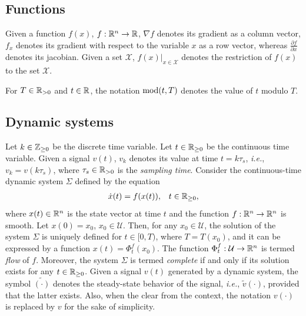\subsection*{Functions}
Given a function $f(x)$, $f : \mathbb{R}^n \rightarrow \mathbb{R}$, $\nabla f$ denotes its gradient as a column vector, $f_x$ denotes its gradient with respect to the variable $x$ as a row vector, whereas $\frac{\partial f}{\partial x}$ denotes its jacobian. Given a set $\mathcal{X}$, $\left.f(x)\right|_{x\in\mathcal{X}}$ denotes the restriction of $f(x)$ to the set $\mathcal{X}$.

For $T\in\mathbb{R}_{>0}$ and $t\in\mathbb{R}$, the notation $\operatorname{mod}(t, T)$ denotes the value of $t$ modulo $T$.

\subsection*{Dynamic systems}
Let $k\in\mathbb{Z}_{\geq 0}$ be the discrete time variable.
Let $t\in\mathbb{R}_{\geq 0}$ be the continuous time variable.
Given a signal $v(t)$, $v_k$ denotes its value at time $t=k\tau_s$, \emph{i.e.}, $v_k=v(k\tau_s)$, where $\tau_s\in\mathbb{R}_{>0}$ is the \emph{sampling time}.
Consider the continuous-time dynamic system $\Sigma$ defined by the equation
\begin{align*}
  \dot{x}(t) &= f(x(t)), & t\in\mathbb{R}_{\geq 0},
\end{align*}
where $x(t)\in\mathbb{R}^n$ is the state vector at time $t$ and the function $f : \mathbb{R}^n \rightarrow \mathbb{R}^n$ is smooth. Let $x(0) = x_0$, $x_0\in\mathcal{U}$. Then, for any $x_0\in\mathcal{U}$, the solution of the system $\Sigma$ is uniquely defined for $t\in[0,T)$, where $T = T(x_0)$, and it can be expressed by a function $x(t) = \Phi_t^f(x_0)$. The function $\Phi_t^f : \mathcal{U} \rightarrow \mathbb{R}^n$ is termed \emph{flow} of $f$. Moreover, the system $\Sigma$ is termed \emph{complete} if and only if its solution exists for any $t\in\mathbb{R}_{\geq 0}$.
Given a signal $v(t)$ generated by a dynamic system, the symbol $\tilde{(\cdot)}$ denotes the steady-state behavior of the signal, \emph{i.e.}, $\tilde{v}(\cdot)$, provided that the latter exists. Also, when the clear from the context, the notation $v(\cdot)$ is replaced by $v$ for the sake of simplicity.

